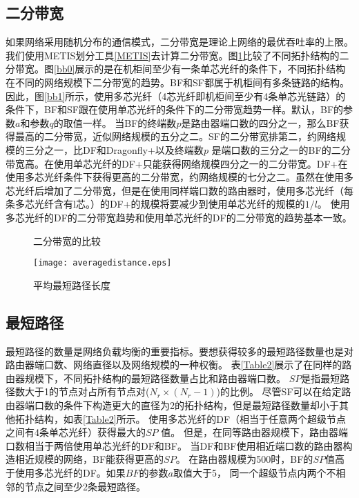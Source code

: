 \subsection{二分带宽}

如果网络采用随机分布的通信模式，二分带宽是理论上网络的最优吞吐率的上限。我们使用METIS划分工具\ref{METIS}去计算二分带宽。图\ref{bb}比较了不同拓扑结构的二分带宽。图\ref{bb0}展示的是在机柜间至少有一条单芯光纤的条件下，不同拓扑结构在不同的网络规模下二分带宽的趋势。BF和SF都属于机柜间有多条链路的结构。因此，图\ref{bb1}所示，使用多芯光纤（4芯光纤即机柜间至少有4条单芯光链路）的条件下，BF和SF跟在使用单芯光纤的条件下的二分带宽趋势一样。默认，BF的参数$a$和参数$q$的取值一样。 当BF的终端数$p$是路由器端口数的四分之一，那么BF获得最高的二分带宽，近似网络规模的五分之二。SF的二分带宽排第二，约网络规模的三分之一，比DF和Dragonfly+以及终端数$p$ 是端口数的三分之一的BF的二分带宽高。在使用单芯光纤的DF+只能获得网络规模四分之一的二分带宽。DF+在使用多芯光纤条件下获得更高的二分带宽，约网络规模的七分之二。虽然在使用多芯光纤后增加了二分带宽，但是在使用同样端口数的路由器时，使用多芯光纤（每条多芯光纤含有l芯。）的DF+的规模将要减少到使用单芯光纤的规模的$1/l$。 使用多芯光纤的DF的二分带宽趋势和使用单芯光纤的DF的二分带宽的趋势基本一致。

\begin{figure}[t]
\setlength{\belowcaptionskip}{-.3cm}%
\centering
  \vspace{-.3cm}
  \caption{二分带宽的比较}
  \label{bb}
\end{figure}

\begin{figure}[t]
\setlength{\belowcaptionskip}{-.3cm}%
  \centering
  \texttt{[image: averagedistance.eps]}
  \vspace{-.3cm}
  \caption{平均最短路径长度}
  \label{ad}
\end{figure}


\subsection{最短路径}

最短路径的数量是网络负载均衡的重要指标。要想获得较多的最短路径数量也是对路由器端口数、网络直径以及网络规模的一种权衡。
表\ref{Table2}展示了在同样的路由器规模下，不同拓扑结构的最短路径数量占比和路由器端口数。
$SP$是指最短路径数大于1的节点对占所有节点对($N_r\times(N_r-1)$)的比例。
尽管SF可以在给定路由器端口数的条件下构造更大的直径为2的拓扑结构，但是最短路径数量却小于其他拓扑结构，如表\ref{Table2}所示。
使用多芯光纤的DF（相当于任意两个超级节点之间有4条单芯光纤）获得最大的$SP$ 值。
但是，在同等路由器规模下，路由器端口数相当于两倍使用单芯光纤的DF和BF。
当DF和BF使用相近端口数的路由器构造相近规模的网络，BF能获得更高的$SP$。
在路由器规模为500时，BF的$SP$值高于使用多芯光纤的DF。如果$BF$的参数$a$取值大于5，
同一个超级节点内两个不相邻的节点之间至少2条最短路径。


